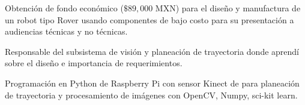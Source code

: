 \documentclass[]{tex/deedy-resume-openfont}
\begin{document}
\begin{minipage}[t]{0.66\textwidth}
\vspace{\topsep} %
\begin{tightemize}
\item Obtención de fondo económico ($\$89,000$ MXN) para el diseño y manufactura de un robot tipo Rover usando componentes de bajo costo para su presentación a audiencias técnicas y no técnicas.
\item Responsable del subsistema de visión y planeación de trayectoria donde aprendí sobre el diseño e importancia de requerimientos.
\item Programación en Python de Raspberry Pi con sensor Kinect de para planeación de trayectoria y procesamiento de imágenes con OpenCV, Numpy, sci-kit learn.
\end{tightemize}

\begin{comment}
\section{Research}
\runsubsection{Data Driven Inference of Complex Dynamics}
\descript{\\Dr. Jorge X. Velasco}
\location{Oct 2019 –- | Instituto de Matemáticas UNAM unidad Juriquilla, QRO.}
\vspace{\topsep} %
\begin{tightemize}
\item Analysis and caracterization of Dengue incidence cases in Mexico database.
\item Study of Koopman operator theory for non-linear dynamical system analysis including state of the art DMD algorithms for data-driven inference.
\item Hankel alternative view of Koopman (HAVOK) implementation in Julia with automatic estimation of suitable parameter space. DOI:10.1038/s41467-017-00030-8
\end{tightemize}
\sectionsep

\end{comment}
\begin{comment}
    

\end{comment}
\end{minipage}
\end{document}
